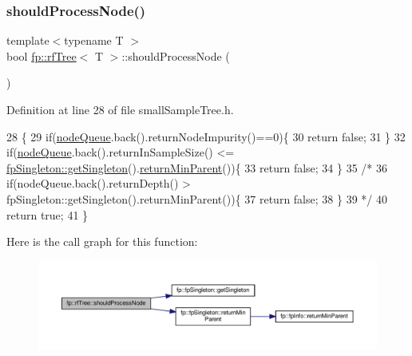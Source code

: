 \subsubsection{\texorpdfstring{should\+Process\+Node()}{shouldProcessNode()}\hspace{0.1cm}{\footnotesize\ttfamily [2/2]}}
{\footnotesize\ttfamily template$<$typename T $>$ \\
bool \hyperlink{classfp_1_1rfTree}{fp\+::rf\+Tree}$<$ T $>$\+::should\+Process\+Node (\begin{DoxyParamCaption}{ }\end{DoxyParamCaption})\hspace{0.3cm}{\ttfamily [inline]}}



Definition at line 28 of file small\+Sample\+Tree.\+h.


\begin{DoxyCode}
28                                                \{
29                     \textcolor{keywordflow}{if}(\hyperlink{classfp_1_1rfTree_af72d0a2f930fd480dfb4858885c2df23}{nodeQueue}.back().returnNodeImpurity()==0)\{
30                         \textcolor{keywordflow}{return} \textcolor{keyword}{false};
31                     \}
32                     \textcolor{keywordflow}{if}(\hyperlink{classfp_1_1rfTree_af72d0a2f930fd480dfb4858885c2df23}{nodeQueue}.back().returnInSampleSize() <= 
      \hyperlink{classfp_1_1fpSingleton_a8bdae77b68521003e3fc630edec2e240}{fpSingleton::getSingleton}().\hyperlink{classfp_1_1fpSingleton_a2d06406b6462099e0adb393218090420}{returnMinParent}())\{
33                         \textcolor{keywordflow}{return} \textcolor{keyword}{false};
34                     \}
35                     \textcolor{comment}{/*}
36 \textcolor{comment}{                         if(nodeQueue.back().returnDepth() >
       fpSingleton::getSingleton().returnMinParent())\{}
37 \textcolor{comment}{                         return false;}
38 \textcolor{comment}{                         \}}
39 \textcolor{comment}{                         */}
40                     \textcolor{keywordflow}{return} \textcolor{keyword}{true};
41                 \}
\end{DoxyCode}
Here is the call graph for this function\+:
\nopagebreak
\begin{figure}[H]
\begin{center}
\leavevmode
\includegraphics[width=350pt]{classfp_1_1rfTree_a36abf82d31ca57670b09da16525dce0d_cgraph}
\end{center}
\end{figure}


